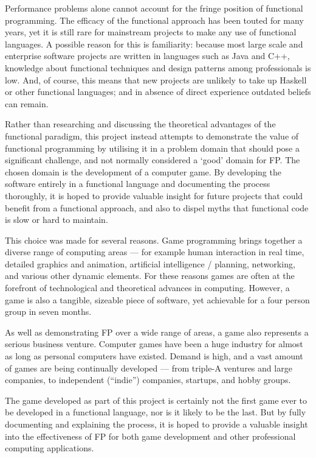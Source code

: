 Performance problems alone cannot account for the fringe position of functional programming. The efficacy of the functional approach has been touted for many years, yet it is still rare for mainstream projects to make any use of functional languages. A possible reason for this is familiarity: because most large scale and enterprise software projects are written in languages such as Java and C++, knowledge about functional techniques and design patterns among professionals is low. And, of course, this means that new projects are unlikely to take up Haskell or other functional languages; and in absence of direct experience outdated beliefs can remain.

Rather than researching and discussing the theoretical advantages of the functional paradigm, this project instead attempts to demonstrate the value of functional programming by utilising it in a problem domain that should pose a significant challenge, and not normally considered a `good' domain for FP. The chosen domain is the development of a computer game. By developing the software entirely in a functional language and documenting the process thoroughly, it is hoped to provide valuable insight for future projects that could benefit from a functional approach, and also to dispel myths that functional code is slow or hard to maintain.

This choice was made for several reasons. Game programming brings together a diverse range of computing areas --- for example human interaction in real time, detailed graphics and animation, artificial intelligence / planning, networking, and various other dynamic elements. For these reasons games are often at the forefront of technological and theoretical advances in computing. However, a game is also a tangible, sizeable piece of software, yet achievable for a four person group in seven months. 

As well as demonstrating FP over a wide range of areas, a game also represents a serious business venture.\cite[1em]{essentialFacts2012} Computer games have been a huge industry for almost as long as personal computers have existed. Demand is high, and a vast amount of games are being continually developed --- from triple-A ventures and large companies, to independent (``indie'') companies, startups, and hobby groups.

The game developed as part of this project is certainly not the first game ever to be developed in a functional language, nor is it likely to be the last. But by fully documenting and explaining the process, it is hoped to provide a valuable insight into the effectiveness of FP for both game development and other professional computing applications.

